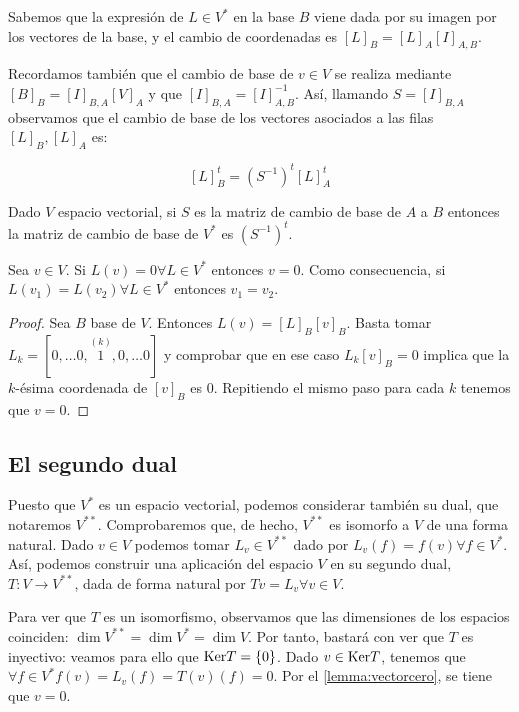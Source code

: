 Sabemos que la expresión de \(L\in V^{*}\) en la base \(B\) viene dada
por su imagen por los vectores de la base, y el cambio de coordenadas es
\([L]_B=[L]_A[I]_{A,B}\).

Recordamos también que el cambio de base de \(v\in V\) se realiza
mediante \([B]_B=[I]_{B,A}[V]_A\) y que \([I]_{B,A}=[I]_{A,B}^{-1}\).
Así, llamando \(S=[I]_{B,A}\) observamos que el cambio de base de los
vectores asociados a las filas \([L]_B, [L]_A\) es:

\[
  [L]_{B}^t=(S^{-1})^t[L]_{A}^t
\]

\begin{prop}
Dado $V$ espacio vectorial, si $S$ es la matriz de cambio de base de $A$ a $B$ entonces la matriz de cambio de base de $V^{*}$ es $(S^{-1})^t$.
\end{prop}

\begin{lemma}
  \label{lemma:vectorcero}
  Sea $v\in V$. Si $L(v)=0\forall L\in V^{*}$ entonces $v=0$. Como consecuencia, si $L(v_1)=L(v_2)\forall L\in V^{*}$ entonces $v_1=v_2$.
  
  \begin{proof}
    Sea $B$ base de $V$. Entonces $L(v)=[L]_B[v]_B$. Basta tomar $L_k=[0, \dots 0, \overset{(k)}{1}, 0, \dots 0]$ y comprobar que en ese caso $L_k[v]_B=0$ implica que la $k$-ésima coordenada de $[v]_B$ es 0. Repitiendo el mismo paso para cada $k$ tenemos que $v=0$.
  \end{proof}
\end{lemma}

\subsection{El segundo dual}\label{el-segundo-dual}

Puesto que \(V^{*}\) es un espacio vectorial, podemos considerar también
su dual, que notaremos \(V^{**}\). Comprobaremos que, de hecho,
\(V^{**}\) es isomorfo a \(V\) de una forma natural. Dado \(v\in V\)
podemos tomar \(L_{v}\in V^{**}\) dado por
\(L_{v}(f) = f(v)\forall f\in V^{*}\). Así, podemos construir una
aplicación del espacio \(V\) en su segundo dual,
\(T:V\rightarrow V^{**}\), dada de forma natural por
\(Tv=L_v\forall v\in V\).

Para ver que \(T\) es un isomorfismo, observamos que las dimensiones de
los espacios coinciden: \(\dim V^{**}=\dim V^{*}=\dim V\). Por tanto,
bastará con ver que \(T\) es inyectivo: veamos para ello que
\(\mathrm{Ker} T=\{0\}\). Dado \(v\in \mathrm{Ker} T\), tenemos que
\(\forall f\in V^{*} f(v)=L_v(f)=T(v)(f)=0\). Por el
\autoref{lemma:vectorcero}, se tiene que \(v=0\).

